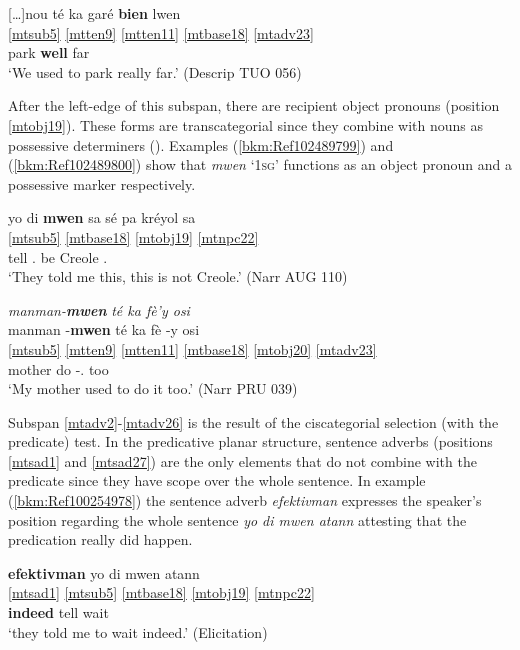 \documentclass[output=paper]{langscibook}
\begin{document}
\ea\label{bkm:Ref100222335}
\glll \textup{[…]}nou té ka garé \textbf{bien} lwen\\
\ref{mtsub5} \ref{mtten9} \ref{mtten11} \ref{mtbase18} \ref{mtadv23} {} \\
\First\Pl{} \Pst{} \Impf{} park \textbf{well} far\\
\glt `We used to park really far.' (Descrip TUO 056)
\z

After the left-edge of this subspan, there are recipient object pronouns (position \ref{mtobj19}). These forms are transcategorial since they combine with nouns as possessive determiners (\citealt{Colot2013}). Examples (\ref{bkm:Ref102489799}) and (\ref{bkm:Ref102489800}) show that \textit{mwen} ‘\textsc{1sg’} functions as an object pronoun and a possessive marker respectively.

\ea\label{bkm:Ref102489799}
\glll yo di \textbf{mwen} sa sé pa kréyol sa\\
\ref{mtsub5} \ref{mtbase18} \ref{mtobj19} \ref{mtnpc22} {} {} {} {} \\
\Third\Pl{} tell \textbf{\First\Sg{}} \Dem{}.\Pr{} be \Neg{} Creole \Dem.\Pr{}\\
\glt `They told me this, this is not Creole.' (Narr AUG 110)
\z

\ea\label{bkm:Ref102489800}
\textit{manman-}\textbf{\textit{mwen}} \textit{té ka fè’y osi}\\
\glll manman -\textbf{mwen} té ka fè -y osi\\
\ref{mtsub5} {} \ref{mtten9} \ref{mtten11} \ref{mtbase18} \ref{mtobj20} \ref{mtadv23} \\
mother \textbf{\First\Sg{}} \Pst{} \Impf{} do -\Third\Sg.\Obj{} too\\
\glt `My mother used to do it too.' (Narr PRU 039)
\z

Subspan \ref{mtadv2}-\ref{mtadv26} is the result of the ciscategorial selection (with the predicate) test. In the predicative planar structure, sentence adverbs (positions \ref{mtsad1} and \ref{mtsad27}) are the only elements that do not combine with the predicate since they have scope over the whole sentence. In example (\ref{bkm:Ref100254978}) the sentence adverb \textit{efektivman} expresses the speaker’s position regarding the whole sentence \textit{yo di mwen atann} attesting that the predication really did happen.

\ea\label{bkm:Ref100254978}
\glll \textbf{efektivman} yo di mwen atann\\
\ref{mtsad1} \ref{mtsub5} \ref{mtbase18} \ref{mtobj19} \ref{mtnpc22} \\ 
\textbf{indeed} \Third\Pl{} tell \First\Sg{} wait\\
\glt `they told me to wait indeed.' (Elicitation)
\z
\end{document}
